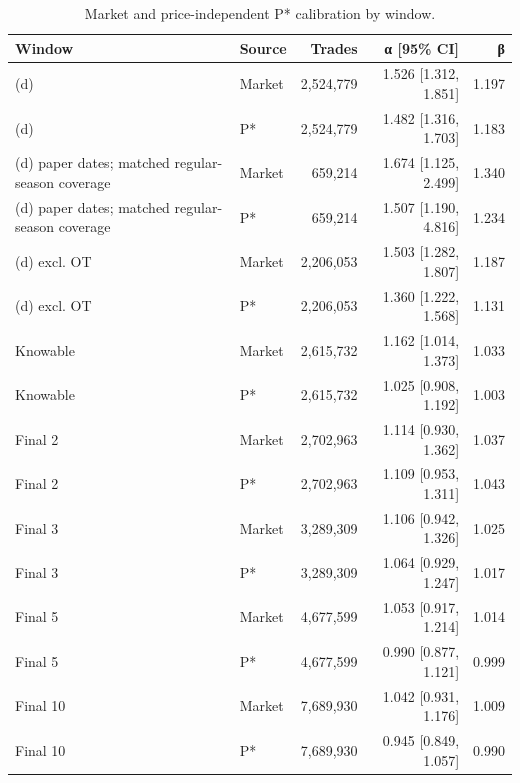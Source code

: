 \begin{table}[!htbp]
\centering
\small
\caption{Market and price-independent P* calibration by window.}
\label{tab:pstar-placebo}
\begin{tabular}{llrrr}
\toprule
Window & Source & Trades & α [95\% CI] & β \\
\midrule
(d) & Market & 2,524,779 & 1.526 [1.312, 1.851] & 1.197 \\
(d) & P* & 2,524,779 & 1.482 [1.316, 1.703] & 1.183 \\
(d) paper dates; matched regular-season coverage & Market & 659,214 & 1.674 [1.125, 2.499] & 1.340 \\
(d) paper dates; matched regular-season coverage & P* & 659,214 & 1.507 [1.190, 4.816] & 1.234 \\
(d) excl. OT & Market & 2,206,053 & 1.503 [1.282, 1.807] & 1.187 \\
(d) excl. OT & P* & 2,206,053 & 1.360 [1.222, 1.568] & 1.131 \\
Knowable & Market & 2,615,732 & 1.162 [1.014, 1.373] & 1.033 \\
Knowable & P* & 2,615,732 & 1.025 [0.908, 1.192] & 1.003 \\
Final 2 & Market & 2,702,963 & 1.114 [0.930, 1.362] & 1.037 \\
Final 2 & P* & 2,702,963 & 1.109 [0.953, 1.311] & 1.043 \\
Final 3 & Market & 3,289,309 & 1.106 [0.942, 1.326] & 1.025 \\
Final 3 & P* & 3,289,309 & 1.064 [0.929, 1.247] & 1.017 \\
Final 5 & Market & 4,677,599 & 1.053 [0.917, 1.214] & 1.014 \\
Final 5 & P* & 4,677,599 & 0.990 [0.877, 1.121] & 0.999 \\
Final 10 & Market & 7,689,930 & 1.042 [0.931, 1.176] & 1.009 \\
Final 10 & P* & 7,689,930 & 0.945 [0.849, 1.057] & 0.990 \\
\bottomrule
\end{tabular}
\end{table}
